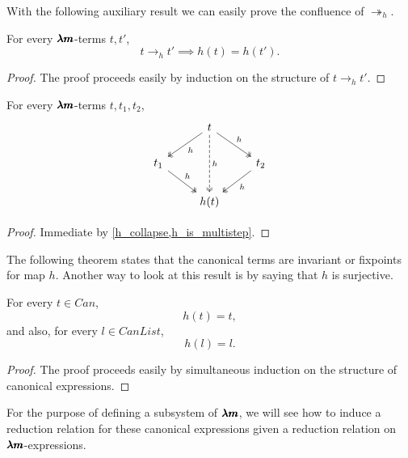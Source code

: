 With the following auxiliary result we can easily prove the confluence of $\twoheadrightarrow_h$.

\begin{lemma}
  \label{h_collapse}
  For every $\pmb{\lambda m}$-terms $t, t'$, \[ t \to_h t' \implies h(t) = h(t'). \]
\end{lemma}
\begin{proof}
  The proof proceeds easily by induction on the structure of $t \to_h t'$.
\end{proof}

\begin{corollary}
  For every $\pmb{\lambda m}$-terms $t, t_1, t_2$,
  \[\begin{tikzcd}
      & t \arrow[ld, two heads, "h"] \arrow[rd, two heads, "h"] \arrow[dd, two heads, dashed, "h"] & \\
      t_1 \arrow[rd, two heads, "h"] && t_2 \arrow[ld, two heads, "h"] \\
      & h(t) & 
    \end{tikzcd}\]
\end{corollary}
\begin{proof}
  Immediate by \cref{h_collapse,h_is_multistep}.
\end{proof}

The following theorem states that the canonical terms are invariant or fixpoints for map $h$.
Another way to look at this result is by saying that $h$ is surjective.

\begin{proposition}
  \label{h_fixpoints}
  For every $t \in Can$, \[ h(t) = t, \]
  and also, for every $l \in CanList$, \[ h(l) = l. \]
\end{proposition}
\begin{proof}
  The proof proceeds easily by simultaneous induction on the structure of canonical expressions.
\end{proof}

For the purpose of defining a subsystem of $\pmb{\lambda m}$, we will see how to induce a reduction relation for these canonical expressions given a reduction relation on $\pmb{\lambda m}$-expressions.


